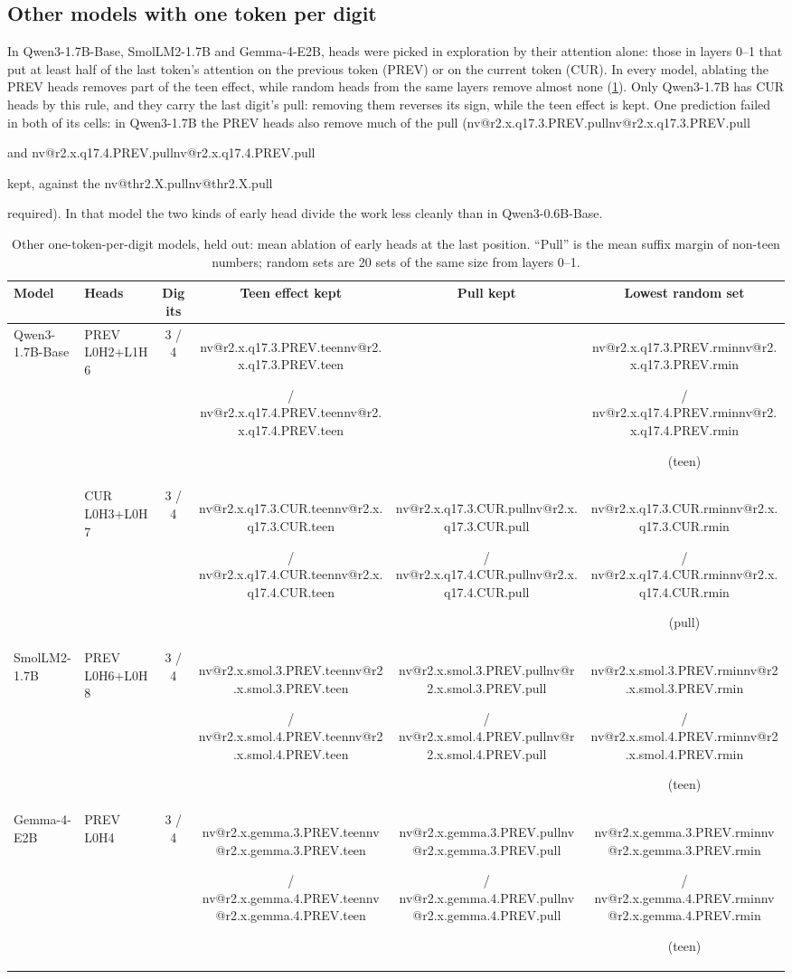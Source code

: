 \documentclass[11pt]{article}
\makeatletter
\newcommand{\nv}[1]{\ifcsname nv@#1\endcsname\csname nv@#1\endcsname\else\PackageError{numbers}{Unknown number key #1}{}\fi}
\newcommand{\qw}{Qwen3-0.6B-Base}
\newcommand{\hd}[2]{L#1H#2}
\makeatother
\begin{document}
\subsection{Other models with one token per digit}

In Qwen3-1.7B-Base, SmolLM2-1.7B and Gemma-4-E2B, heads were picked in exploration by their attention alone: those in layers 0--1 that put at least half of the last token's attention on the previous token (PREV) or on the current token (CUR). In every model, ablating the PREV heads removes part of the teen effect, while random heads from the same layers remove almost none (\cref{tab:other}). Only Qwen3-1.7B has CUR heads by this rule, and they carry the last digit's pull: removing them reverses its sign, while the teen effect is kept. One prediction failed in both of its cells: in Qwen3-1.7B the PREV heads also remove much of the pull (\nv{r2.x.q17.3.PREV.pull} and \nv{r2.x.q17.4.PREV.pull} kept, against the \nv{thr2.X.pull} required). In that model the two kinds of early head divide the work less cleanly than in \qw{}.

\begin{table}[t]
\centering\small
\caption{Other one-token-per-digit models, held out: mean ablation of early heads at the last position. ``Pull'' is the mean suffix margin of non-teen numbers; random sets are 20 sets of the same size from layers 0--1.}
\label{tab:other}
\begin{tabular}{@{}l l c c c c@{}}
\toprule
Model & Heads & Digits & Teen effect kept & Pull kept & Lowest random set \\
\midrule
Qwen3-1.7B-Base & PREV \hd{0}{2}+\hd{1}{6} & 3 / 4 & \nv{r2.x.q17.3.PREV.teen} / \nv{r2.x.q17.4.PREV.teen} & \textbf{\nv{r2.x.q17.3.PREV.pull}} / \textbf{\nv{r2.x.q17.4.PREV.pull}} & \nv{r2.x.q17.3.PREV.rmin} / \nv{r2.x.q17.4.PREV.rmin} (teen) \\
 & CUR \hd{0}{3}+\hd{0}{7} & 3 / 4 & \nv{r2.x.q17.3.CUR.teen} / \nv{r2.x.q17.4.CUR.teen} & \nv{r2.x.q17.3.CUR.pull} / \nv{r2.x.q17.4.CUR.pull} & \nv{r2.x.q17.3.CUR.rmin} / \nv{r2.x.q17.4.CUR.rmin} (pull) \\
SmolLM2-1.7B & PREV \hd{0}{6}+\hd{0}{8} & 3 / 4 & \nv{r2.x.smol.3.PREV.teen} / \nv{r2.x.smol.4.PREV.teen} & \nv{r2.x.smol.3.PREV.pull} / \nv{r2.x.smol.4.PREV.pull} & \nv{r2.x.smol.3.PREV.rmin} / \nv{r2.x.smol.4.PREV.rmin} (teen) \\
Gemma-4-E2B & PREV \hd{0}{4} & 3 / 4 & \nv{r2.x.gemma.3.PREV.teen} / \nv{r2.x.gemma.4.PREV.teen} & \nv{r2.x.gemma.3.PREV.pull} / \nv{r2.x.gemma.4.PREV.pull} & \nv{r2.x.gemma.3.PREV.rmin} / \nv{r2.x.gemma.4.PREV.rmin} (teen) \\
\bottomrule
\end{tabular}
\end{table}
\end{document}
